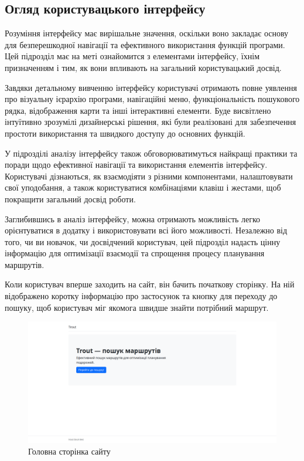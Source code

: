 \subsection{Огляд користувацького інтерфейсу}
\label{subsec:interface-subsection}

Розуміння інтерфейсу має вирішальне значення, оскільки воно закладає основу для безперешкодної навігації та ефективного використання функцій програми. Цей підрозділ має на меті ознайомится з елементами інтерфейсу, їхнім призначенням і тим, як вони впливають на загальний користувацький досвід.

Завдяки детальному вивченню інтерфейсу користувачі отримають повне уявлення про візуальну ієрархію програми, навігаційні меню, функціональність пошукового рядка, відображення карти та інші інтерактивні елементи. Буде висвітлено інтуїтивно зрозумілі дизайнерські рішення, які були реалізовані для забезпечення простоти використання та швидкого доступу до основних функцій.

У підрозділі аналізу інтерфейсу також обговорюватимуться найкращі практики та поради щодо ефективної навігації та використання елементів інтерфейсу. Користувачі дізнаються, як взаємодіяти з різними компонентами, налаштовувати свої уподобання, а також користуватися комбінаціями клавіш і жестами, щоб покращити загальний досвід роботи.

Заглибившись в аналіз інтерфейсу, можна отримають можливість легко орієнтуватися в додатку і використовувати всі його можливості. Незалежно від того, чи ви новачок, чи досвідчений користувач, цей підрозділ надасть цінну інформацію для оптимізації взаємодії та спрощення процесу планування маршрутів.

Коли користувач вперше заходить на сайт, він бачить початкову сторінку. На ній відображено коротку інформацію про застосунок та кнопку для переходу до пошуку, щоб користувач міг якомога швидше знайти потрібний маршрут.

\begin{figure}[!htp]
	\centering
	\includegraphics[scale=0.4]{content/chapters/4-results/assets/img/example_mainpage.png}
	\caption{Головна сторінка сайту}
	\label{fig:main_page}
\end{figure}

